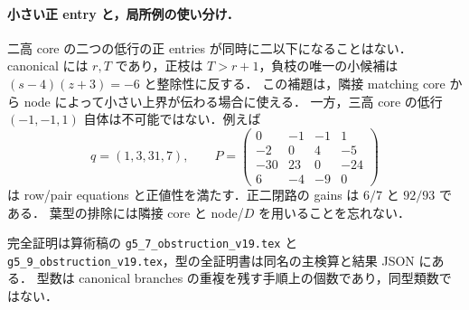 \paragraph{小さい正 entry と，局所例の使い分け．}
二高 core の二つの低行の正 entries が同時に二以下になることはない．
canonical には $r,T$ であり，正枝は $T>r+1$，負枝の唯一の小候補は
$(s-4)(z+3)=-6$ と整除性に反する．
この補題は，隣接 matching core から node によって小さい上界が伝わる場合に使える．
一方，三高 core の低行 $(-1,-1,1)$ 自体は不可能ではない．例えば
\[
 q=(1,3,31,7),\qquad
 P=\begin{pmatrix}
 0&-1&-1&1\\-2&0&4&-5\\-30&23&0&-24\\6&-4&-9&0
 \end{pmatrix}
\]
は row/pair equations と正値性を満たす．正二閉路の gains は $6/7$ と $92/93$ である．
葉型の排除には隣接 core と node/$D$ を用いることを忘れない．

完全証明は算術稿の \nolinkurl{g5_7_obstruction_v19.tex} と
\nolinkurl{g5_9_obstruction_v19.tex}，型の全証明書は同名の主検算と結果 JSON にある．
型数は canonical branches の重複を残す手順上の個数であり，同型類数ではない．
